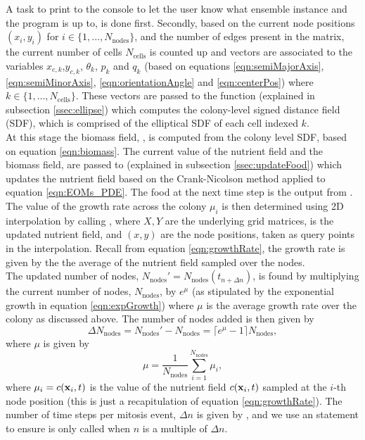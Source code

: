 A task to print to the console to let the user know what ensemble instance
and  the program is up to, is done first.
Secondly, based on the current node positions $(x_i,y_i)$ for
$i \in \{1, ..., N_{\textrm{nodes}}\}$, and the number
of edges present in the  matrix, the current number of cells
$N_{\textrm{cells}}$ is counted up
and vectors are associated to the variables $x_{c,k}$,$y_{c,k}$,
$\theta_k$, $p_k$ and $q_k$ (based on equations
 \ref{eqn:semiMajorAxis}, \ref{eqn:semiMinorAxis},
\ref{eqn:orientationAngle} and \ref{eqn:centerPos}) where $k \in \{1, ..., N_{\textrm{cells}}\}$.
These vectors are passed to the function  (explained in 
subsection \ref{ssec:ellipse})
which computes the colony-level signed distance field (SDF),
which is comprised of the elliptical SDF of each cell indexed $k$.
\\

At this stage the biomass field, , is computed 
from the colony level SDF, based on equation \ref{eqn:biomass}.
The current value of the nutrient field and the biomass field,
are passed to  (explained in 
subsection \ref{ssec:updateFood}) which updates the nutrient field
based on the Crank-Nicolson method applied to equation \ref{eqn:EOMs_PDE}.
The food at the next time step is the output from .
\\

The value of the growth rate across the colony $\mu_i$ is then determined
using 2D interpolation by calling ,
where $X, Y$ are the underlying grid matrices,  is the updated nutrient 
field, and $(x,y)$ are the node positions, taken as query points in the interpolation.
Recall from equation \ref{eqn:growthRate}, the growth rate 
is given by the the average of the nutrient field sampled over the nodes.
\\

The updated number of nodes, $N_{\textrm{nodes}}' = N_{\textrm{nodes}}(t_{n + \Delta n})$, is found 
by multiplying the current number of nodes, $N_{\textrm{nodes}}$,
by $e^{\mu}$ (as stipulated by the exponential growth in equation \ref{eqn:expGrowth}) where $\mu$ is the average growth rate over the colony 
as discussed above. The number of nodes added is then given by 
\begin{equation*}
    \Delta N_{\textrm{nodes}} = N_{\textrm{nodes}}' - N_{\textrm{nodes}} = \lceil e^{\mu} -1 \rceil N_{\textrm{nodes}},
\end{equation*}
where $\mu$ is given by 
\begin{equation*}
    \mu = \frac{1}{N_{\textrm{nodes}}} \sum_{i = 1}^{N_{\textrm{nodes}}} \mu_i,
\end{equation*}
where $\mu_i = c(\vb{x}_i, t)$ is the value of the nutrient field $c(\vb{x}_i, t)$ sampled 
at the $i$-th node position (this is just a recapitulation of equation \ref{eqn:growthRate}).
The number of time steps per mitosis event, $\Delta n$ is given by ,
and we use an  statement to ensure  is only called when $n$ 
is a multiple of $\Delta n$.
\\

